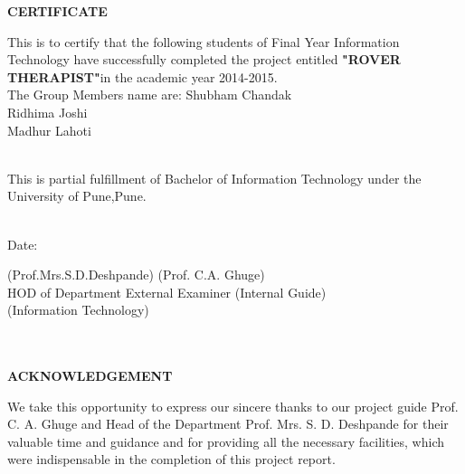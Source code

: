 \documentclass[12pt,a4paper]{article}
\begin{document}
\begin{center}
\textbf{\large{CERTIFICATE}}\\
\end{center}

		\noindent
  				\setlength{\baselineskip}{1.5\baselineskip}
	\begin{center}
\begin{flushleft}
This is to certify that the following students of Final Year Information Technology have successfully completed the project entitled \textbf{\small"ROVER THERAPIST"}in the academic year 2014-2015.\\
The Group Members name are: Shubham Chandak\\
		\hspace{5.76 cm}					Ridhima Joshi\\
		\hspace{5.76 cm}					Madhur Lahoti\\
\\
\end{flushleft} 

\begin{flushleft}
This is partial fulfillment of Bachelor of Information Technology under the University of Pune,Pune.

\\
Date:
\\
\end{flushleft}
	\end{center} 
		\vspace{0.6 in}
(Prof.Mrs.S.D.Deshpande)\hspace{2.8 in} (Prof. C.A. Ghuge)\\
HOD of Department\hspace{1 in} External Examiner\hspace{1 in}  (Internal Guide)\\
(Information Technology)\\\\\
\singlespace


\newpage
{}
\pagestyle{plain}           %
\begin{center}
\bf ACKNOWLEDGEMENT
\end{center}
\hspace{0.7cm}We take this opportunity to express our sincere thanks to our project guide Prof. C. A. Ghuge and Head of the Department Prof. Mrs. S. D. Deshpande for their valuable time and guidance and for providing all the necessary facilities, which were indispensable in the completion of this project report. 
\end{document}
